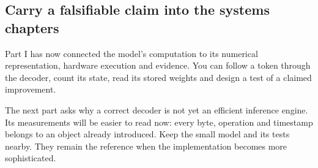 \subsection{Carry a falsifiable claim into the systems chapters}
Part I has now connected the model's computation to its numerical
representation, hardware execution and evidence. You can follow
a token through the decoder, count its state, read its stored
weights and design a test of a claimed improvement.

The next part asks why a correct decoder is not yet an efficient
inference engine. Its measurements will be easier to read now:
every byte, operation and timestamp belongs to an object already
introduced. Keep the small model and its tests nearby. They remain
the reference when the implementation becomes more sophisticated.


